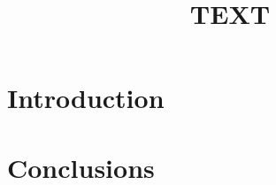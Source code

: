 \documentclass{iopjournal}
\begin{document}

\title{TEXT}





\begin{abstract}
\end{abstract}

\section{Introduction}
\label{sec:introduction}

%

\section{Conclusions}
\label{sec:conclusions}

%
%








\end{document}
